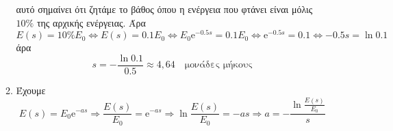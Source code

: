 \begin{enumerate}
\begin{solution}
\begin{enumerate}
          αυτό σημαίνει ότι ζητάμε το βάθος όπου η ενέργεια που φτάνει είναι μόλις 
          $ 10\% $ της αρχικής ενέργειας. Άρα
          \[ 
            E(s) = 10\% E_{0} \Leftrightarrow E(s) = 0.1E_{0} \Leftrightarrow E_{0}
            \mathrm{e}^{-0.5s} = 0.1E_{0} \Leftrightarrow \mathrm{e}^{-0.5s} = 0.1
            \Leftrightarrow -0.5s = \ln{0.1} 
          \]
          άρα
          \[
            s = - \frac{\ln{0.1}}{0.5} \approx 4,64 \quad\text{μονάδες μήκους}
          \] 
        \item Έχουμε 
          \[
            E(s) = E_{0} \mathrm{e}^{-as} \Rightarrow \frac{E(s)}{E_{0}} =
            \mathrm{e}^{-as} \Rightarrow \ln{\frac{E(s)}{E_{0}}} = -as \Rightarrow 
            a = - \frac{\ln{\frac{E(s)}{E_{0}}}}{s}
           \] 
      \end{enumerate}
    \end{solution}
\end{enumerate}


